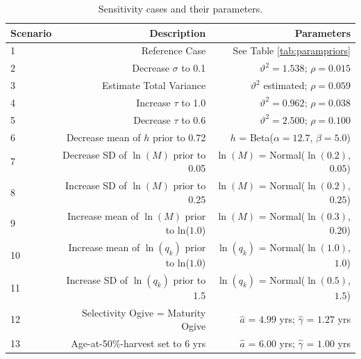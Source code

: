 \documentclass[11pt]{book}\usepackage[]{graphicx}\usepackage[]{color}
\begin{document}
\begin{table}[H]
\centering
\caption{\label{tab:sensitivities}Sensitivity cases and their parameters.}
\begin{tabular}{lrr}
\hline
\textbf{Scenario   } & \textbf{Description}                         & \textbf{Parameters} \\
\hline
1           & Reference Case                               & See Table \ref{tab:parampriors} \\
2           & Decrease $\sigma$ to 0.1                      & $\vartheta^2=1.538$; $\rho=0.015$ \\
3           & Estimate Total Variance                       & $\vartheta^2$ estimated; $\rho=0.059$ \\
4           & Increase $\tau$ to 1.0                        & $\vartheta^2=0.962$; $\rho=0.038$ \\
5           & Decrease $\tau$ to 0.6                        & $\vartheta^2=2.500$; $\rho=0.100$ \\
6           & Decrease mean of $h$ prior to 0.72            & $h$ = Beta($\alpha=12.7$, $\beta=5.0$) \\
7           & Decrease SD of $\ln(M)$ prior to 0.05          & $\ln(M)$ = Normal($\ln(0.2)$, $0.05$) \\
8           & Increase SD of $\ln(M)$ prior to 0.25          & $\ln(M)$ = Normal($\ln(0.2)$, $0.25$) \\
9           & Increase mean of $\ln(M)$ prior to ln($1.0$)   & $\ln(M)$ = Normal($\ln(0.3)$, $0.20$) \\
10          & Increase mean of $\ln(q_k)$ prior to ln($1.0$) & $\ln(q_k)$ = Normal($\ln(1.0)$, $1.0$) \\
11          & Increase SD of $\ln(q_k)$ prior to 1.5         & $\ln(q_k)$ = Normal($\ln(0.5)$, $1.5$) \\
12          & Selectivity Ogive = Maturity Ogive            & $\hat{a}$ = $4.99$ yrs; $\hat{\gamma}$ = $1.27$ yrs \\
13          & Age-at-50\%-harvest set to 6 yrs              & $\hat{a}$ = $6.00$ yrs; $\hat{\gamma}$ = $1.00$ yrs \\
\hline
\end{tabular}
\end{table}
\end{document}
